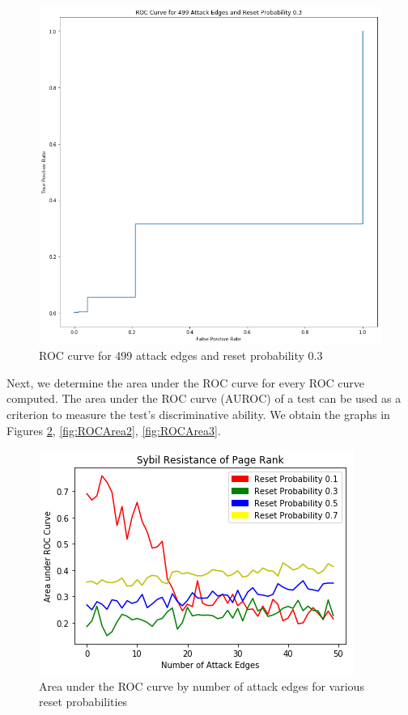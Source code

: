 \documentclass[twocolumn]{article}
\theoremstyle{definition}
\theoremstyle{theorem}
\begin{document}
\begin{figure}
\includegraphics[scale=0.3]{ROCCurve3}
\caption{ROC curve for 499 attack edges and reset probability 0.3}
\label{fig:ROCCurve3}
\end{figure}

\noindent Next, we determine the area under the ROC curve for every ROC curve computed. The area under the ROC curve (AUROC) of a test can be used as a criterion to measure the test's discriminative ability. We obtain the graphs in Figures \ref{fig:ROCArea1}, \ref{fig:ROCArea2}, \ref{fig:ROCArea3}.\vspace{1em}\\

\begin{figure}
\includegraphics[scale=0.6]{ROCArea1}
\caption{Area under the ROC curve by number of attack edges for various reset probabilities}
\label{fig:ROCArea1}
\end{figure}
\end{document}
